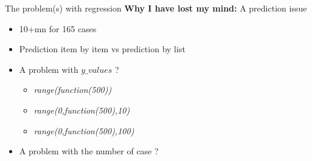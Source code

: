 \begin{frame}{The problem(s) with regression}
    \textbf{Why I have lost my mind:} A prediction issue

    \begin{itemize}
        \item 10+mn for 165 cases
        \vspace{0.2cm}
        \item Prediction item by item vs prediction by list
        \vspace{0.2cm}
        \item A problem with $y\_values$ ?
        \begin{itemize}
            \item \textit{range(function(500))}
            \item \textit{range(0,function(500),10)}
            \item \textit{range(0,function(500),100)}
        \end{itemize}
        \vspace{0.2cm}
        \item A problem with the number of case ?


    \end{itemize}
    
\end{frame}
